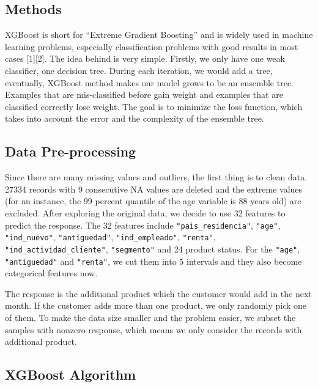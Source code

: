\documentclass{article}
\begin{document}
\begin{spacing}{1.5}
\begin{large}
\section{Methods}

\noindent \indent XGBoost is short for ``Extreme Gradient Boosting” and is widely used in machine learning problems, especially classification problems with good results in most cases [1][2]. The idea behind is very simple. Firstly, we only have one weak classifier, one decision tree. During each iteration, we would add a tree, eventually, XGBoost method makes our model grows to be an ensemble tree. Examples that are mis-classified before gain weight and examples that are classified correctly lose weight. The goal is to minimize the loss function, which takes into account the error and the complexity of the ensemble tree.

\subsection{Data Pre-processing}

\noindent \indent Since there are many missing values and outliers, the first thing is to clean data. 27334 records with 9 consecutive NA values are deleted and the extreme values (for an instance, the 99 percent quantile of the age variable is 88 years old) are excluded. After exploring the original data, we decide to use 32 features to predict the response. The 32 features include \verb|"pais_residencia"|, \verb|"age"|, \verb|"ind_nuevo"|, \verb|"antiguedad"|, \verb|"ind_empleado"|, \verb|"renta"|, \verb|"ind_actividad_cliente"|, \verb|"segmento"| and 24 product status. For the \verb|"age"|, \verb|"antiguedad"| and \verb|"renta"|, we cut them into 5 intervals and they also become categorical features now. 

The response is the additional product which the customer would add in the next month. If the customer adds more than one product, we only randomly pick one of them. To make the data size smaller and the problem easier, we subset the samples with nonzero response, which means we only consider the records with additional product.

\subsection{XGBoost Algorithm}


\end{large}
\end{spacing}
\end{document}
